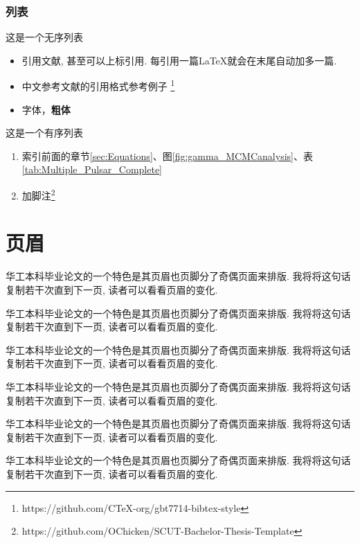 \documentclass{scutbthesis}
\begin{document}
\subsubsection{列表}
\label{sec:font_list_etc:list}
这是一个无序列表
\begin{itemize}
\item 引用文献\cite{long2015fully}, 甚至可以上标引用. 每引用一篇\LaTeX 就会在末尾自动加多一篇.
\item 中文参考文献的引用格式参考例子\cite{cn2} \footnote{https://github.com/CTeX-org/gbt7714-bibtex-style}
\item 字体{\color{red}{变红}}，\textbf{粗体}
\end{itemize}

这是一个有序列表
\begin{enumerate}
\item 索引前面的章节\ref{sec:Equations}、图\ref{fig:gamma_MCMCanalysis}、表\ref{tab:Multiple_Pulsar_Complete}
\item 加脚注\footnote{https://github.com/OChicken/SCUT-Bachelor-Thesis-Template}
\end{enumerate}

\pagebreak[4]

\section{页眉}
华工本科毕业论文的一个特色是其页眉也页脚分了奇偶页面来排版. 我将将这句话复制若干次直到下一页, 读者可以看看页眉的变化.

华工本科毕业论文的一个特色是其页眉也页脚分了奇偶页面来排版. 我将将这句话复制若干次直到下一页, 读者可以看看页眉的变化.

华工本科毕业论文的一个特色是其页眉也页脚分了奇偶页面来排版. 我将将这句话复制若干次直到下一页, 读者可以看看页眉的变化.

华工本科毕业论文的一个特色是其页眉也页脚分了奇偶页面来排版. 我将将这句话复制若干次直到下一页, 读者可以看看页眉的变化.

华工本科毕业论文的一个特色是其页眉也页脚分了奇偶页面来排版. 我将将这句话复制若干次直到下一页, 读者可以看看页眉的变化.

华工本科毕业论文的一个特色是其页眉也页脚分了奇偶页面来排版. 我将将这句话复制若干次直到下一页, 读者可以看看页眉的变化.
\end{document}
